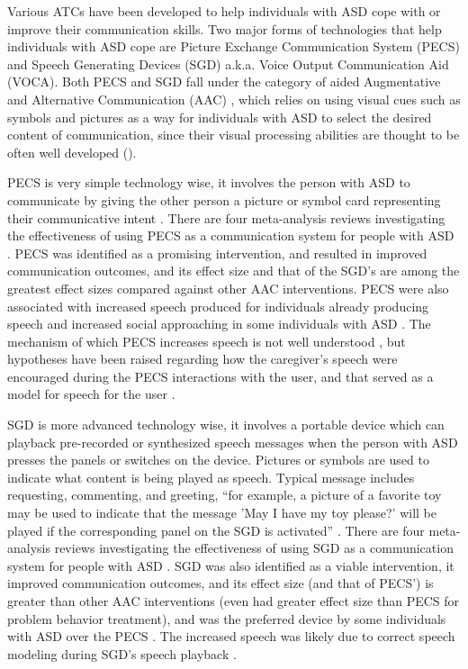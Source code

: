 Various ATCs have been developed to help individuals with ASD cope with or improve their communication skills.  Two major forms of technologies that help individuals with ASD cope are Picture Exchange Communication System (PECS) and Speech Generating Devices (SGD) a.k.a. Voice Output Communication Aid (VOCA).  Both PECS and SGD fall under the category of aided Augmentative and Alternative Communication (AAC) \cite{sigafoos2001conditional}, which relies on using visual cues such as symbols and pictures as a way for individuals with ASD to select the desired content of communication, since their visual processing abilities are thought to be often well developed (\cite{mirenda2001autism, shane2012applying}).

PECS is very simple technology wise, it involves the person with ASD to communicate by giving the other person a picture or symbol card representing their communicative intent \cite{bondy1994picture}.  There are four meta-analysis reviews investigating the effectiveness of using PECS as a communication system for people with ASD \cite{ganz2012meta, ganz2012metab, sulzer2009picture, tincani2010quantitative}.  PECS was identified as a promising intervention, and resulted in improved communication outcomes, and its effect size and that of the SGD's are among the greatest effect sizes compared against other AAC interventions.  PECS were also associated with increased speech produced for individuals already producing speech and increased social approaching in some individuals with ASD \cite{lang2014assistive}.  The mechanism of which PECS increases speech is not well understood \cite{preston2009review}, but hypotheses have been raised regarding how the caregiver's speech were encouraged during the PECS interactions with the user, and that served as a model for speech for the user \cite{yoder2006randomized}.

SGD is more advanced technology wise, it involves a portable device which can playback pre-recorded or synthesized speech messages when the person with ASD presses the panels or switches on the device.  Pictures or symbols are used to indicate what content is being played as speech.  Typical message includes requesting, commenting, and greeting, ``for example, a picture of a favorite toy may be used to indicate that the message 'May I have my toy please?' will be played if the corresponding panel on the SGD is activated'' \cite{lang2014assistive}.  There are four meta-analysis reviews investigating the effectiveness of using SGD as a communication system for people with ASD \cite{van2010communication, van2011assessing, ganz2012metab, ganz2013moderation}.  SGD was also identified as a viable intervention, it improved communication outcomes, and its effect size (and that of PECS') is greater than other AAC interventions (even had greater effect size than PECS for problem behavior treatment), and was the preferred device by some individuals with ASD over the PECS \cite{lang2014assistive}.  The increased speech was likely due to correct speech modeling during SGD's speech playback \cite{schlosser2008effects}.

